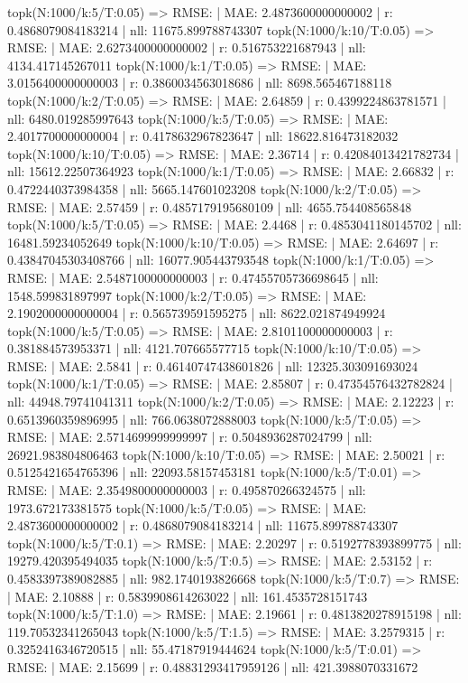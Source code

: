 topk(N:1000/k:5/T:0.05) => RMSE: | MAE: 2.4873600000000002 | r: 0.4868079084183214 | nll: 11675.899788743307
topk(N:1000/k:10/T:0.05) => RMSE: | MAE: 2.6273400000000002 | r: 0.516753221687943 | nll: 4134.417145267011
topk(N:1000/k:1/T:0.05) => RMSE: | MAE: 3.0156400000000003 | r: 0.3860034563018686 | nll: 8698.565467188118
topk(N:1000/k:2/T:0.05) => RMSE: | MAE: 2.64859 | r: 0.4399224863781571 | nll: 6480.019285997643
topk(N:1000/k:5/T:0.05) => RMSE: | MAE: 2.4017700000000004 | r: 0.4178632967823647 | nll: 18622.816473182032
topk(N:1000/k:10/T:0.05) => RMSE: | MAE: 2.36714 | r: 0.42084013421782734 | nll: 15612.22507364923
topk(N:1000/k:1/T:0.05) => RMSE: | MAE: 2.66832 | r: 0.4722440373984358 | nll: 5665.147601023208
topk(N:1000/k:2/T:0.05) => RMSE: | MAE: 2.57459 | r: 0.4857179195680109 | nll: 4655.754408565848
topk(N:1000/k:5/T:0.05) => RMSE: | MAE: 2.4468 | r: 0.4853041180145702 | nll: 16481.59234052649
topk(N:1000/k:10/T:0.05) => RMSE: | MAE: 2.64697 | r: 0.43847045303408766 | nll: 16077.905443793548
topk(N:1000/k:1/T:0.05) => RMSE: | MAE: 2.5487100000000003 | r: 0.47455705736698645 | nll: 1548.599831897997
topk(N:1000/k:2/T:0.05) => RMSE: | MAE: 2.1902000000000004 | r: 0.565739591595275 | nll: 8622.021874949924
topk(N:1000/k:5/T:0.05) => RMSE: | MAE: 2.8101100000000003 | r: 0.381884573953371 | nll: 4121.707665577715
topk(N:1000/k:10/T:0.05) => RMSE: | MAE: 2.5841 | r: 0.46140747438601826 | nll: 12325.303091693024
topk(N:1000/k:1/T:0.05) => RMSE: | MAE: 2.85807 | r: 0.47354576432782824 | nll: 44948.79741041311
topk(N:1000/k:2/T:0.05) => RMSE: | MAE: 2.12223 | r: 0.6513960359896995 | nll: 766.0638072888003
topk(N:1000/k:5/T:0.05) => RMSE: | MAE: 2.5714699999999997 | r: 0.5048936287024799 | nll: 26921.983804806463
topk(N:1000/k:10/T:0.05) => RMSE: | MAE: 2.50021 | r: 0.5125421654765396 | nll: 22093.58157453181
topk(N:1000/k:5/T:0.01) => RMSE: | MAE: 2.3549800000000003 | r: 0.495870266324575 | nll: 1973.672173381575
topk(N:1000/k:5/T:0.05) => RMSE: | MAE: 2.4873600000000002 | r: 0.4868079084183214 | nll: 11675.899788743307
topk(N:1000/k:5/T:0.1) => RMSE: | MAE: 2.20297 | r: 0.5192778393899775 | nll: 19279.420395494035
topk(N:1000/k:5/T:0.5) => RMSE: | MAE: 2.53152 | r: 0.4583397389082885 | nll: 982.1740193826668
topk(N:1000/k:5/T:0.7) => RMSE: | MAE: 2.10888 | r: 0.5839908614263022 | nll: 161.4535728151743
topk(N:1000/k:5/T:1.0) => RMSE: | MAE: 2.19661 | r: 0.4813820278915198 | nll: 119.70532341265043
topk(N:1000/k:5/T:1.5) => RMSE: | MAE: 3.2579315 | r: 0.3252416346720515 | nll: 55.47187919444624
topk(N:1000/k:5/T:0.01) => RMSE: | MAE: 2.15699 | r: 0.48831293417959126 | nll: 421.3988070331672
